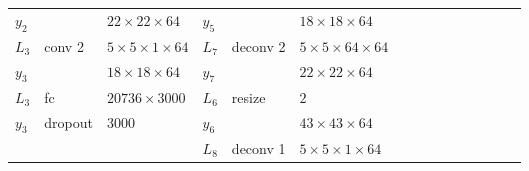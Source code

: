 \begin{landscape}
\begin{table}[h]
{\begin{tabular}{lllllllllllllll}
				\multicolumn{1}{|l|}{$y_2$}   &          & \multicolumn{1}{l|}{$22\times22\times 64$}       & \multicolumn{1}{l|}{$y_5$}   &          & \multicolumn{1}{l|}{$18\times18\times64$}         &                              &                & \multicolumn{1}{l}{}                       &   &                             &         &                             &                            &   \\ \cline{1-6}
				\multicolumn{1}{|l|}{$L_3$}   & conv 2   & \multicolumn{1}{l|}{$5\times 5\times1\times 64$} & \multicolumn{1}{l|}{$L_7$}   & deconv 2 & \multicolumn{1}{l|}{$5\times 5\times64\times 64$} &                              &                & \multicolumn{1}{l}{}                       &   &                             &         &                             &                            &   \\
				\multicolumn{1}{|l|}{$y_3$}   &          & \multicolumn{1}{l|}{$18\times18\times64$}        & \multicolumn{1}{l|}{$y_7$}   &          & \multicolumn{1}{l|}{$22\times22\times64$}         &                              &                & \multicolumn{1}{l}{}                       &   &                             &         &                             &                            &   \\ \cline{1-6}
				\multicolumn{1}{|l|}{$L_3$}   & fc       & \multicolumn{1}{l|}{$20736\times3000$}           & \multicolumn{1}{l|}{$L_6$}   & resize   & \multicolumn{1}{l|}{$2$}                          &                              &                & \multicolumn{1}{l}{}                       &   &                             &         &                             &                            &   \\
				\multicolumn{1}{|l|}{$y_3$}   & dropout  & \multicolumn{1}{l|}{$3000$}                      & \multicolumn{1}{l|}{$y_6$}   &          & \multicolumn{1}{l|}{$43\times43\times64$}         &                              &                & \multicolumn{1}{l}{}                       &   &                             &         &                             &                            &   \\ \cline{1-6}
				                              &          &                                                  & \multicolumn{1}{|l|}{$L_8$}  & deconv 1 & \multicolumn{1}{l|}{$5\times 5\times1\times 64$}  &                              &                & \multicolumn{1}{l}{}                       &   &                             &         &                             &                            &   \\

\end{tabular}}
\end{table}
\end{landscape}
